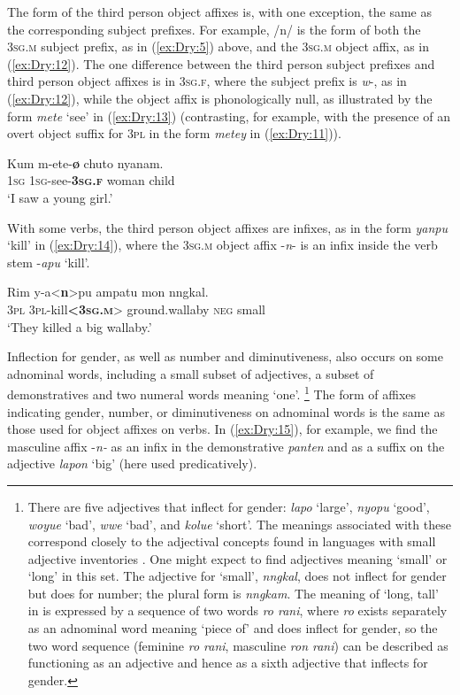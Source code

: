 \documentclass[output=collectionpaper]{langsci/langscibook}
\begin{document}
The form of the third person object affixes is, with one exception, the same as the corresponding subject prefixes. For example, /n/ is the form of both the \textsc{3sg.m} subject prefix, as in (\ref{ex:Dry:5}) above, and the \textsc{3sg.m} object affix, as in (\ref{ex:Dry:12}). The one difference between the third person subject prefixes and third person object affixes is in \textsc{3sg.f}, where the subject prefix is \textit{w}{}-, as in (\ref{ex:Dry:12}), while the object affix is phonologically null, as illustrated by the form \textit{mete} `see' in (\ref{ex:Dry:13}) (contrasting, for example, with the presence of an overt object suffix for \textsc{3pl} in the form \textit{metey} in (\ref{ex:Dry:11})).

\ea  \label{ex:Dry:13}
\gll Kum	m-ete-\textbf{ø}	chuto	nyanam.\\
\textsc{1sg} \textsc{1sg}-see-\textbf{\textsc{3sg.f}} woman child\\
\glt `I saw a young girl.'
\z

With some verbs, the third person object affixes are infixes, as in the form \textit{yanpu} `kill' in (\ref{ex:Dry:14}), where the \textsc{3sg.m} object affix -\textit{n}{}- is an infix inside the verb stem -\textit{apu} `kill'.

\ea  \label{ex:Dry:14}
\gll Rim	y-a<\textbf{n}>pu	ampatu	mon	nngkal.\\
\textsc{3pl} \textsc{3pl}-kill\textbf{<\textsc{3sg.m}}> ground.wallaby \textsc{neg}  small\\
\glt `They killed a big wallaby.'
\z

Inflection for gender, as well as number and diminutiveness, also occurs on some adnominal words, including a small subset of adjectives, a subset of demonstratives and two numeral words meaning `one'.%
\footnote{There are five adjectives that inflect for gender: \textit{lapo} `large', \textit{nyopu} `good', \textit{woyue} `bad', \textit{wwe} `bad', and \textit{kolue} `short'. The meanings associated with these correspond closely to the adjectival concepts found in languages with small adjective inventories \citep{Dixon1977}. One might expect to find adjectives meaning `small' or `long' in this set. The  adjective for `small', \textit{nngkal}, does not inflect for gender but does for number; the plural form is \textit{nngkam}. The meaning of `long, tall' in  is expressed by a sequence of two words \textit{ro rani}, where \textit{ro} exists separately as an adnominal word meaning `piece of' and does inflect for gender, so the two word sequence (feminine \textit{ro rani}, masculine \textit{ron rani}) can be described as functioning as an adjective and hence as a sixth adjective that inflects for gender.} The form of affixes indicating gender, number, or diminutiveness on adnominal words is the same as those used for object affixes on verbs. In (\ref{ex:Dry:15}), for example, we find the masculine affix -\textit{n-} as an infix in the demonstrative \textit{panten} and as a suffix on the adjective \textit{lapon} `big' (here used predicatively).
\end{document}
